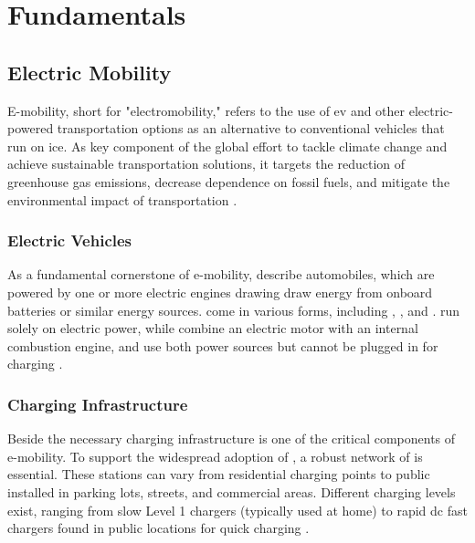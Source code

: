 \chapter{Fundamentals}

\section{Electric Mobility}
\label{ch:Introduction:sec:Electric Mobility}

E-mobility, short for "electromobility," refers to the use of \acrfull{ev} and other electric-powered transportation options as an alternative to conventional vehicles that run on \acrfull{ice}. As key component of the global effort to tackle climate change and achieve sustainable transportation solutions, it targets the reduction of greenhouse gas emissions, decrease dependence on fossil fuels, and mitigate the environmental impact of transportation \cite{kathiresh_e-mobility_2022}.

\subsection{Electric Vehicles}
\label{ch:Introduction:sec:Electric Mobility:Electric Vehicles}
As a fundamental cornerstone of e-mobility,  describe automobiles, which are powered by one or more electric engines drawing draw energy from onboard batteries or similar energy sources.  come in various forms, including , , and .  run solely on electric power, while  combine an electric motor with an internal combustion engine, and  use both power sources but cannot be plugged in for charging \cite{kathiresh_e-mobility_2022}.

\subsection{Charging Infrastructure}
\label{ch:Introduction:sec:Electric Mobility:ssec:Charging Infrastructure}

Beside  the necessary charging infrastructure is one of the critical components of e-mobility. To support the widespread adoption of , a robust network of  is essential. These stations can vary from residential charging points to public  installed in parking lots, streets, and commercial areas. Different charging levels exist, ranging from slow Level 1 chargers (typically used at home) to rapid \acrshort{dc} fast chargers found in public locations for quick charging \cite{afshar_literature_2020}.


